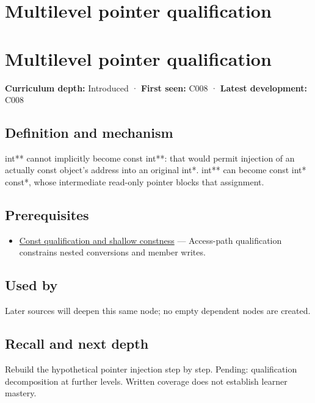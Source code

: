 \hypertarget{appendix-5e1a7561cd98}{}
\section*{Multilevel pointer qualification}
\section{Multilevel pointer qualification}\label{appendix-5e1a7561cd98-multilevel-pointer-qualification}

\textbf{Curriculum depth:} Introduced · \textbf{First seen:} C008 · \textbf{Latest development:} C008

\subsection{Definition and mechanism}\label{appendix-5e1a7561cd98-definition-and-mechanism}

int** cannot implicitly become const int**: that would permit injection of an actually const object's address into an original int*. int** can become const int* const*, whose intermediate read-only pointer blocks that assignment.

\subsection{Prerequisites}\label{appendix-5e1a7561cd98-prerequisites}

\begin{itemize}
\tightlist
\item
  \hyperref[appendix-c25d60fed375]{Const qualification and shallow constness} --- Access-path qualification constrains nested conversions and member writes.
\end{itemize}

\subsection{Used by}\label{appendix-5e1a7561cd98-used-by}

Later sources will deepen this same node; no empty dependent nodes are created.

\subsection{Recall and next depth}\label{appendix-5e1a7561cd98-recall-and-next-depth}

Rebuild the hypothetical pointer injection step by step. Pending: qualification decomposition at further levels. Written coverage does not establish learner mastery.


